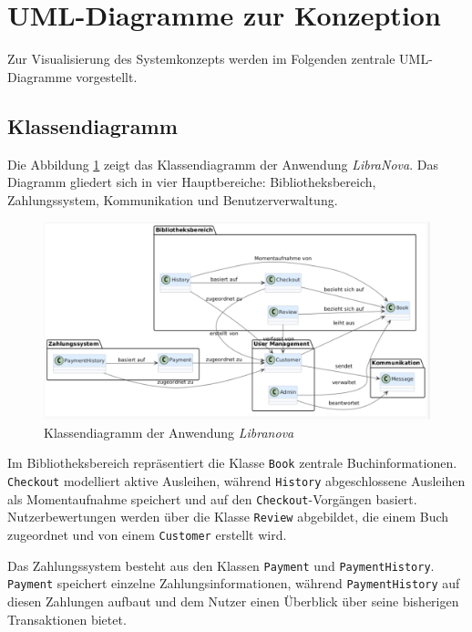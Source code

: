 \section{UML-Diagramme zur Konzeption}
Zur Visualisierung des Systemkonzepts werden im Folgenden zentrale UML-Diagramme vorgestellt.

\subsection{Klassendiagramm}

Die Abbildung \ref{fig:class_diagram} zeigt das Klassendiagramm der Anwendung \textit{LibraNova}. Das Diagramm gliedert sich in vier Hauptbereiche: Bibliotheksbereich, Zahlungssystem, Kommunikation und Benutzerverwaltung.


\begin{figure}[H]
	\centering
	\includegraphics[width=\textwidth]{images/ClassDiagram.png}
	\caption{Klassendiagramm der Anwendung \textit{Libranova}}
	\label{fig:class_diagram}
\end{figure}

\noindent Im Bibliotheksbereich repräsentiert die Klasse \texttt{Book} zentrale Buchinformationen. \texttt{Checkout} modelliert aktive Ausleihen, während \texttt{History} abgeschlossene Ausleihen als Momentaufnahme speichert und auf den \texttt{Checkout}-Vorgängen basiert. Nutzerbewertungen werden über die Klasse \texttt{Review} abgebildet, die einem Buch zugeordnet und von einem \texttt{Customer} erstellt wird.

\noindent Das Zahlungssystem besteht aus den Klassen \texttt{Payment} und \texttt{PaymentHistory}. \texttt{Payment} speichert einzelne Zahlungsinformationen, während \texttt{PaymentHistory} auf diesen Zahlungen aufbaut und dem Nutzer einen Überblick über seine bisherigen Transaktionen bietet.

